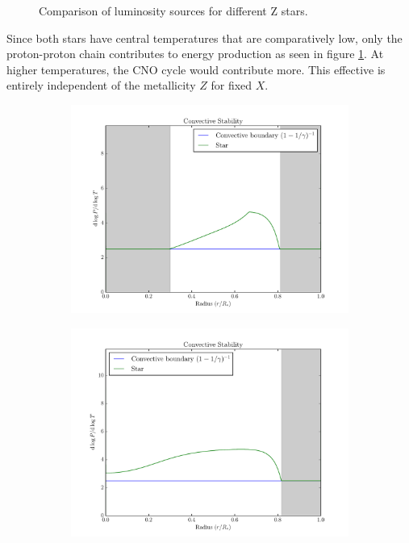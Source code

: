 \documentclass[11pt]{article}
\begin{document}
\begin{center}
\begin{figure}[H]
\begin{subfigure}{.5\textwidth}
            \end{subfigure}
            \caption{Comparison of luminosity sources for different Z stars.}
            \label{fig:luminositycomparisonZ}
        \end{figure}
    \end{center}
    Since both stars have central temperatures that are comparatively low, only the proton-proton chain contributes to energy production as seen in figure \ref{fig:luminositycomparisonZ}. At higher temperatures, the CNO cycle would contribute more. This effective is entirely independent of the metallicity $Z$ for fixed $X$.
    \begin{center}
        \begin{figure}[H]
            \begin{subfigure}{.5\textwidth}
                \centering
                \includegraphics[width=1.1\textwidth]{figures/lowZ/dlogP_dlogT.pdf}
            \end{subfigure}
            \begin{subfigure}{.5\textwidth}
                \centering
                \includegraphics[width=1.1\textwidth]{figures/highZ/dlogP_dlogT.pdf}

\end{subfigure}
\end{figure}
\end{center}
\end{document}
